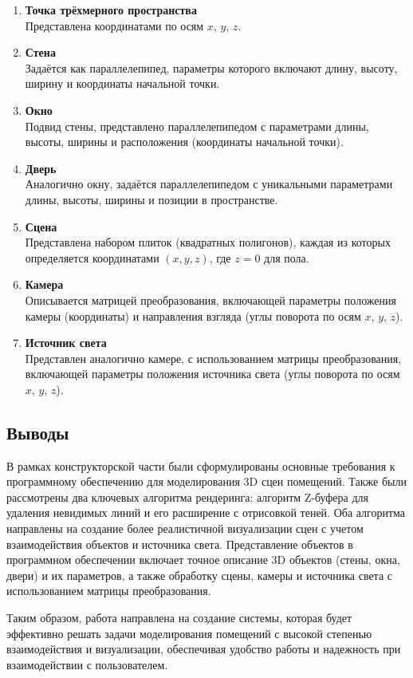 \begin{enumerate}
\item {\bfseries Точка трёхмерного пространства} \\  
   Представлена координатами по осям \(x\), \(y\), \(z\).

\item {\bfseries Стена} \\  
   Задаётся как параллелепипед, параметры которого включают длину, высоту, ширину и координаты начальной точки.

\item {\bfseries Окно} \\  
   Подвид стены, представлено параллелепипедом с параметрами длины, высоты, ширины и расположения (координаты начальной точки).

\item {\bfseries Дверь} \\  
   Аналогично окну, задаётся параллелепипедом с уникальными параметрами длины, высоты, ширины и позиции в пространстве.

\item {\bfseries Сцена} \\  
   Представлена набором плиток (квадратных полигонов), каждая из которых определяется координатами \( (x, y, z) \), где \( z = 0 \) для пола.

\item {\bfseries Камера} \\  
    Описывается матрицей преобразования, включающей параметры положения камеры (координаты) и направления взгляда (углы поворота по осям \(x\), \(y\), \(z\)).

\item {\bfseries Источник света} \\  
   Представлен аналогично камере, с использованием матрицы преобразования, включающей параметры положения источника света (углы поворота по осям \(x\), \(y\), \(z\)).
\end{enumerate}


\subsection{Выводы}

\hspace{1.25cm}
В рамках конструкторской части были сформулированы основные требования к программному обеспечению для моделирования 3D сцен помещений. Также были рассмотрены два ключевых алгоритма рендеринга: алгоритм Z-буфера для удаления невидимых линий и его расширение с отрисовкой теней. Оба алгоритма направлены на создание более реалистичной визуализации сцен с учетом взаимодействия объектов и источника света. Представление объектов в программном обеспечении включает точное описание 3D объектов (стены, окна, двери) и их параметров, а также обработку сцены, камеры и источника света с использованием матрицы преобразования.

Таким образом, работа направлена на создание системы, которая будет эффективно решать задачи моделирования помещений с высокой степенью взаимодействия и визуализации, обеспечивая удобство работы и надежность при взаимодействии с пользователем.


\newpage